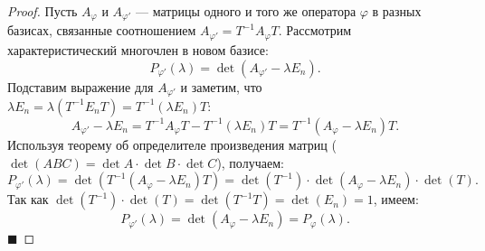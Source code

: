 \begin{proof}
Пусть $A_\varphi$ и $A_{\varphi'}$ --- матрицы одного и того же оператора $\varphi$ в разных базисах, связанные соотношением $A_{\varphi'} = T^{-1} A_\varphi T$. Рассмотрим характеристический многочлен в новом базисе:
\[
P_{\varphi'}(\lambda) = \det(A_{\varphi'} - \lambda E_n).
\]
Подставим выражение для $A_{\varphi'}$ и заметим, что $\lambda E_n = \lambda (T^{-1} E_n T) = T^{-1} (\lambda E_n) T$:
\[
A_{\varphi'} - \lambda E_n = T^{-1} A_\varphi T - T^{-1} (\lambda E_n) T = T^{-1} (A_\varphi - \lambda E_n) T.
\]
Используя теорему об определителе произведения матриц ($\det(ABC) = \det A \cdot \det B \cdot \det C$), получаем:
\[
P_{\varphi'}(\lambda) = \det\left(T^{-1} (A_\varphi - \lambda E_n) T\right) = \det(T^{-1}) \cdot \det(A_\varphi - \lambda E_n) \cdot \det(T).
\]
Так как $\det(T^{-1}) \cdot \det(T) = \det(T^{-1}T) = \det(E_n) = 1$, имеем:
\[
P_{\varphi'}(\lambda) = \det(A_\varphi - \lambda E_n) = P_\varphi(\lambda).
\]
\hfill$\blacksquare$
\end{proof}
